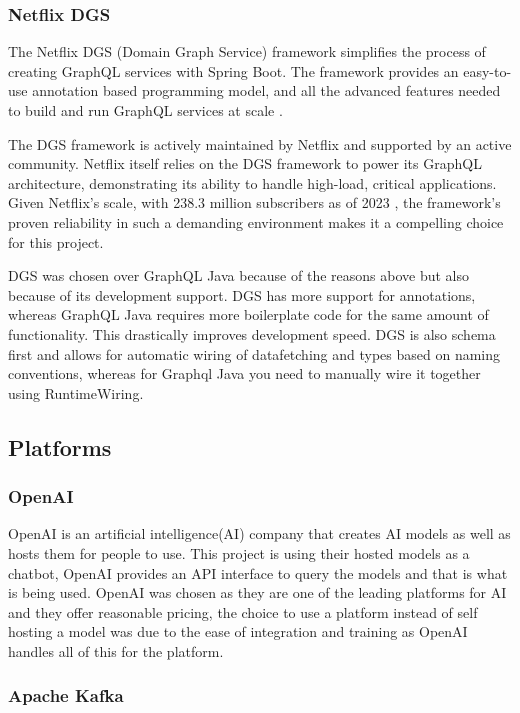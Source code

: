 \documentclass[]{project_report}
\begin{document}
\subsubsection{Netflix DGS}

The Netflix DGS (Domain Graph Service) framework simplifies the process of creating GraphQL services with Spring Boot. The framework provides an easy-to-use annotation based programming model, and all the advanced features needed to build and run GraphQL services at scale \cite{dgs}. 

The DGS framework is actively maintained by Netflix and supported by an active community. Netflix itself relies on the DGS framework to power its GraphQL architecture, demonstrating its ability to handle high-load, critical applications. Given Netflix's scale, with 238.3 million subscribers as of 2023 \cite{netflix_stats}, the framework's proven reliability in such a demanding environment makes it a compelling choice for this project.

DGS was chosen over GraphQL Java because of the reasons above but also because of its development support. DGS has more support for annotations, whereas GraphQL Java requires more boilerplate code for the same amount of functionality. This drastically improves development speed. DGS is also schema first and allows for automatic wiring of datafetching and types based on naming conventions, whereas for Graphql Java you need to manually wire it together using RuntimeWiring. 

\subsection{Platforms}
\subsubsection{OpenAI}

OpenAI is an artificial intelligence(AI) company that creates AI models as well as hosts them for people to use. This project is using their hosted models as a chatbot, OpenAI provides an API interface to query the models and that is what is being used. OpenAI was chosen as they are one of the leading platforms for AI and they offer reasonable pricing, the choice to use a platform instead of self hosting a model was due to the ease of integration and training as OpenAI handles all of this for the platform.


\subsubsection{Apache Kafka}
\end{document}
